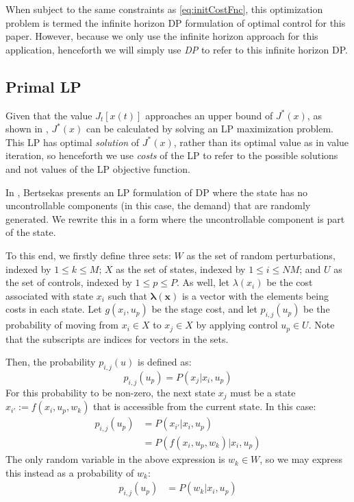 \documentclass[conference]{IEEEtran}
\begin{document}
When subject to the same constraints as \eqref{eq:initCostFnc}, this optimization problem is termed the infinite horizon DP formulation of optimal control for this paper. However, because we only use the infinite horizon approach for this application, henceforth we will simply use \textit{DP} to refer to this infinite horizon DP.

\subsection{Primal LP}
Given that the value $J_{t}[x(t)]$ approaches an upper bound of $J^{*}(x)$, as shown in \cite{Bertsekas:2007:DPO:1396348}, $J^{*}(x)$ can be calculated by solving an LP maximization problem. This LP has optimal \textit{solution} of $J^{*}(x)$, rather than its optimal value as in value iteration, so henceforth we use \textit{costs} of the LP to refer to the possible solutions and not values of the LP objective function.

In \cite{Bertsekas:2007:DPO:1396348}, Bertsekas presents an LP formulation of DP where the state has no uncontrollable components (in this case, the demand) that are randomly generated. We rewrite this in a form where the uncontrollable component is part of the state.

To this end, we firstly define three sets: $W$ as the set of random perturbations, indexed by $1\leq k \leq M$; $X$ as the set of states, indexed by $1\leq i \leq NM$; and $U$ as the set of controls, indexed by $1\leq p \leq P$. As well, let
$\lambda(x_{i})$ be the cost associated with state $x_{i}$ such that $\boldsymbol{\lambda(x)}$ is a vector with the elements being costs in each state. Let $g(x_{i},u_{p})$ be the stage cost, and let $p_{i,j}(u_{p})$ be the probability of moving from $x_{i}\in X$ to $x_{j}\in X$ by applying control $u_{p}\in U$. Note that the subscripts are indices for vectors in the sets. %

Then, the probability $p_{i,j}(u)$ is defined as: 
\begin{displaymath}
p_{i,j}(u_{p})= P(x_{j}| x_{i},u_{p})
\end{displaymath} For this probability to be non-zero, the next state $x_{j}$ must be a state $x_{i'}:=f(x_{i},u_{p},w_{k})$ that is accessible from the current state. In this case:
\begin{align*} 
p_{i,j}(u_{p})&= P(x_{i'}| x_{i},u_{p})\\ 
&= P(f(x_{i},u_{p},w_{k})| x_{i},u_{p})
\end{align*} The only random variable in the above expression is $w_{k}\in W$, so we may express this instead as a probability of $w_{k}$:
\begin{align*} 
    p_{i,j}(u_{p})&= P(w_{k} | x_{i},u_{p})
\end{align*}
\end{document}
